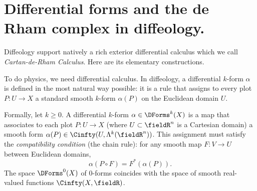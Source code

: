 \section{Differential forms and the de Rham complex in diffeology.}
\label{sec:Differential forms and the de Rham complex in diffeology}

Diffeology support natively a rich exterior differential calculus which we call \emph{Cartan-de-Rham Calculus}.
Here are its elementary constructions.

\begin{article}
  To do physics,
  we need differential calculus.
  In diffeology,
  a differential $k$-form $\alpha$ is defined in the most natural way possible:
  it is a rule that assigns to every plot $P: U \to X$ a standard smooth $k$-form $\alpha(P)$ on the Euclidean domain $U$.
  
  Formally,
  let $k \geq 0$.
  A differential $k$-form $\alpha \in \DForms^k(X)$ is a map that associates to each plot $P: U \to X$ (where $U \subset \fieldR^n$ is a Cartesian domain) a smooth form $\alpha(P) \in \Cinfty(U, \Lambda^k(\fieldR^n))$.
  This assignment must satisfy the \emph{compatibility condition} (the chain rule):
  for any smooth map $F: V \to U$ between Euclidean domains,
  \[
    \alpha(P \circ F) = F^*(\alpha(P)).
    \]
  The space $\DForms^0(X)$ of $0$-forms coincides with the space of smooth real-valued functions $\Cinfty(X, \fieldR)$.
  
\end{article}

